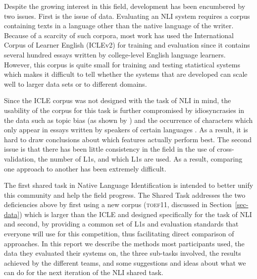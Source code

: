 \documentclass[11pt,letterpaper]{article}
\begin{document}
Despite the growing interest in this field, development has been encumbered
by two issues. First is the issue of data. Evaluating an NLI system requires
 a corpus containing texts in a language other than the native language of
the writer. Because of a scarcity of such corpora, most work has used
the International Corpus of Learner English (ICLEv2) \cite{Granger2009}
for training and evaluation since it contains several hundred essays
written by college-level English language learners. However,
this corpus is quite small for training and testing statistical systems
which makes it difficult to tell whether the systems that are developed can
scale well to larger data sets or to different domains.

Since the ICLE corpus was not designed with the task of NLI in mind, the
usability of the corpus for this task is further compromised by idiosyncrasies
in the data such as topic bias (as shown by ) and the
occurrence of characters which only appear in essays written by speakers of
certain languages \cite{tetreault-EtAl:2012:PAPERS}. As a result, it is hard to
draw conclusions about which features actually perform best. The second issue is
that there has been little consistency in the field in the use of
cross-validation, the number of L1s, and which L1s are used. As a result,
comparing one approach to another has been extremely difficult.

The first shared task in Native Language Identification is intended to
better unify this community and help the field progress. The Shared Task
addresses the two deficiencies above by first using a new corpus (\textsc{toef11},
discussed in Section~\ref{sec-data}) which is larger than the ICLE and designed specifically for the
task of NLI and second, by providing a common set of L1s and evaluation
standards that everyone will use for this competition, thus facilitating direct
comparison of approaches. In this report we describe the methods most
participants used, the data they evaluated their systems on, the three sub-tasks
involved, the results achieved by the different teams, and some suggestions and
ideas about what we can do for the next iteration of the NLI shared task.
\end{document}
